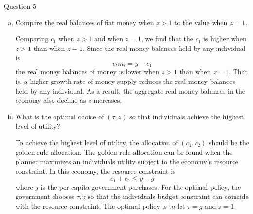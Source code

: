 \documentclass[a4paper]{article}
\newif\IfInSansMode
\numberwithin{equation}{section}
\numberwithin{figure}{section}
\begin{document}
\begin{questionbox}{Question 5}
\begin{enumerate}[(a)]
\begin{explanationbox}
\begin{figure}[H]
				\end{figure}
			\end{explanationbox}
			\item Compare the real balances of fiat money when \( z > 1 \) to the value when \( z = 1 \).
			\begin{explanationbox}
				Comparing \( c_1 \) when \( z > 1 \) and when \( z = 1 \), we find that the \( c_1 \) is higher when \( z > 1 \) than when \( z = 1 \). Since the real money balances held by any individual is
				\[
					v_tm_t = y - c_1
				\]
				the real money balances of money is lower when \( z > 1 \) than when \( z = 1 \). That is, a higher growth rate of money supply reduces the real money balances held by any individual. As a result, the aggregate real money balances in the economy also decline as \( z \) increases.
			\end{explanationbox}\pagebreak
			\item What is the optimal choice of \( (\tau, z) \) so that individuals achieve the highest level of utility?
			\begin{explanationbox}
				To achieve the highest level of utility, the allocation of \( (c_1,c_2) \) should be the golden rule allocation. The golden rule allocation can be found when the planner maximizes an individuals utility subject to the economy's resource constraint. In this economy, the resource constraint is
				\[
					c_1+c_2 \leq y - g
				\]
				where \( g \) is the per capita government purchases. For the optimal policy, the government chooses \( \tau, z \) so that the individuals budget constraint can coincide with the resource constraint. The optimal policy is to let \( \tau = g \)	and \( z = 1 \).
			\end{explanationbox}
		\end{enumerate}
	\end{questionbox}
\end{document}
